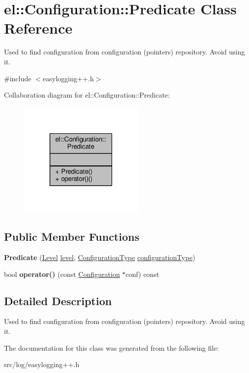 \hypertarget{classel_1_1Configuration_1_1Predicate}{}\section{el\+:\+:Configuration\+:\+:Predicate Class Reference}
\label{classel_1_1Configuration_1_1Predicate}


Used to find configuration from configuration (pointers) repository. Avoid using it.  




{\ttfamily \#include $<$easylogging++.\+h$>$}



Collaboration diagram for el\+:\+:Configuration\+:\+:Predicate\+:
\nopagebreak
\begin{figure}[H]
\begin{center}
\leavevmode
\includegraphics[width=174pt]{d8/d29/classel_1_1Configuration_1_1Predicate__coll__graph}
\end{center}
\end{figure}
\subsection*{Public Member Functions}
\begin{DoxyCompactItemize}
\item 
{\bfseries Predicate} (\hyperlink{namespaceel_ab0ac6091262344c52dd2d3ad099e8e36}{Level} \hyperlink{classel_1_1Configuration_a66a96cf46d20204c50718f8a5e3622e2}{level}, \hyperlink{namespaceel_a281f5db6d6163678bc68a8b23b59e124}{Configuration\+Type} \hyperlink{classel_1_1Configuration_aab5091dcca176e309c0a2268ff55db0d}{configuration\+Type})\hypertarget{classel_1_1Configuration_1_1Predicate_ab0a4580d6c2d1aaf36a62913fdc38447}{}\label{classel_1_1Configuration_1_1Predicate_ab0a4580d6c2d1aaf36a62913fdc38447}

\item 
bool {\bfseries operator()} (const \hyperlink{classel_1_1Configuration}{Configuration} $\ast$conf) const \hypertarget{classel_1_1Configuration_1_1Predicate_a985dce44ae06854e789a2ad3be11698f}{}\label{classel_1_1Configuration_1_1Predicate_a985dce44ae06854e789a2ad3be11698f}

\end{DoxyCompactItemize}


\subsection{Detailed Description}
Used to find configuration from configuration (pointers) repository. Avoid using it. 

The documentation for this class was generated from the following file\+:\begin{DoxyCompactItemize}
\item 
src/log/easylogging++.\+h\end{DoxyCompactItemize}
